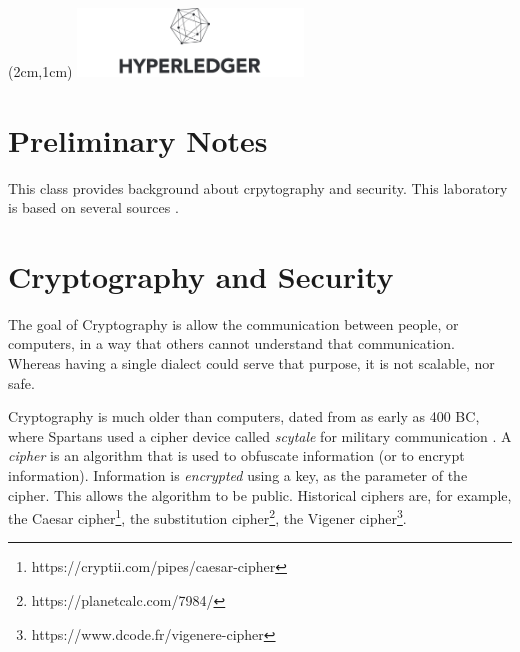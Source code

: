 \documentclass[12pt,a4paper]{article}
\theoremstyle{definition}
\begin{document}
\textblockorigin{-34pt}{-12pt}
\begin{textblock*}{10cm}(2cm,1cm)
\includegraphics[width=6cm]{hyperledger.png}
\end{textblock*}

\section*{Preliminary Notes}
This class provides background about crpytography and security. This laboratory is based on several sources \cite{sdist2017,rogaway2004,md2020}.






\section{Cryptography and Security}
The goal of Cryptography is allow the communication between people, or computers, in a way that others cannot understand that communication. Whereas having a single dialect could serve that purpose, it is not scalable, nor safe.

Cryptography is much older than computers, dated from as early as 400 BC, where Spartans used a cipher device called \emph{scytale} for military communication \cite{simmons}. A \emph{cipher} is an algorithm that is used to obfuscate information (or to encrypt information). Information is \emph{encrypted} using a key, as the parameter of the cipher. This allows the algorithm to be public. Historical ciphers are, for example, the Caesar cipher\footnote{https://cryptii.com/pipes/caesar-cipher}, the substitution cipher\footnote{https://planetcalc.com/7984/}, the Vigener cipher\footnote{https://www.dcode.fr/vigenere-cipher}. 
\end{document}

